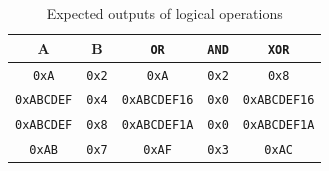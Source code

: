 \documentclass[CMPE]{../KGCOEReport}
\def\code#1{\texttt{#1}}
\begin{document}
    \begin{table}[H]
        \renewcommand{\arraystretch}{1.2}
        \setlength{\tabcolsep}{12pt}
        \caption{Expected outputs of logical operations}
        \begin{center}
            \begin{tabular}{|c|c||c|c|c|}
                \hline
A & B & \code{OR} & \code{AND} & \code{XOR}\\\hline

	\code{0xA} & \code{0x2} & \code{0xA} & \code{0x2} & \code{0x8}\\\hline

	\code{0xABCDEF} & \code{0x4} & \code{0xABCDEF16} & \code{0x0} & \code{0xABCDEF16} 
	\\\hline

	\code{0xABCDEF} & \code{0x8} & \code{0xABCDEF1A} & \code{0x0} & \code{0xABCDEF1A}
	\\\hline

	\code{0xAB} & \code{0x7} & \code{0xAF} & \code{0x3} & \code{0xAC}
	\\\hline

            \end{tabular}
        \end{center}
        \label{tab:oax}
    \end{table}
    
\end{document}
